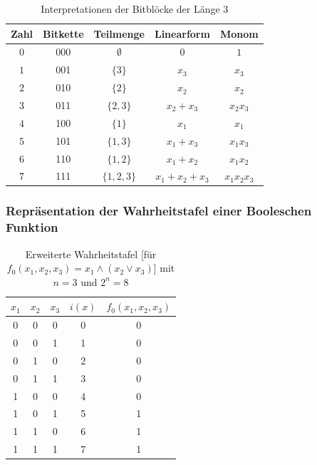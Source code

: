 \begin{refsegment}
\begin{table}[hbpt]
\begin{center}
  \begin{tabular}{|c|c|c|c|c|} \hline
    Zahl & Bitkette & Teilmenge   & Linearform    & Monom       \\ \hline
    $0$  &   000    & $\emptyset$ &    $0$        &  $1$        \\
    $1$  &   001    & $\{3\}$     &    $x_3$      &  $x_3$      \\
    $2$  &   010    & $\{2\}$     &    $x_2$      &  $x_2$      \\
    $3$  &   011    & $\{2,3\}$   &  $x_2+x_3$    &  $x_2x_3$   \\
    $4$  &   100    & $\{1\}$     &    $x_1$      &  $x_1$      \\
    $5$  &   101    & $\{1,3\}$   &  $x_1+x_3$    &  $x_1x_3$   \\
    $6$  &   110    & $\{1,2\}$   &  $x_1+x_2$    &  $x_1x_2$   \\
    $7$  &   111    & $\{1,2,3\}$ & $x_1+x_2+x_3$ & $x_1x_2x_3$ \\ \hline
  \end{tabular}
\end{center}
\caption{Interpretationen der Bitblöcke der Länge $3$}\label{tab-bool-3}
\end{table}


\subsubsection*{Repräsentation der Wahrheitstafel einer Booleschen Funktion}

\begin{table}[hbpt]
\begin{center}
\begin{tabular}{|ccc|c|c|} \hline
   $x_1$ & $x_2$ & $x_3$ & $i(x)$ & $f_0(x_1,x_2,x_3)$ \\ \hline
      0  &   0   &   0   &   0    &  0  \\
      0  &   0   &   1   &   1    &  0  \\
      0  &   1   &   0   &   2    &  0  \\
      0  &   1   &   1   &   3    &  0  \\
      1  &   0   &   0   &   4    &  0  \\
      1  &   0   &   1   &   5    &  1  \\
      1  &   1   &   0   &   6    &  1  \\
      1  &   1   &   1   &   7    &  1  \\
   \hline
\end{tabular}
\end{center}
\caption{Erweiterte Wahrheitstafel [für
   $f_0(x_1,x_2,x_3) = x_1 \wedge (x_2 \vee x_3)$]
   mit $n = 3$ und $2^n = 8$}\label{tab-bool-wt2}
\end{table}


\end{refsegment}

